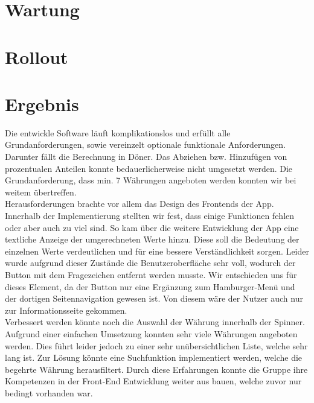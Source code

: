 \documentclass[conference]{IEEEtran}
\begin{document}
\section{Wartung}

\section{Rollout}

\section{Ergebnis}

Die entwickle Software läuft komplikationslos und erfüllt alle Grundanforderungen, sowie vereinzelt optionale funktionale Anforderungen. Darunter fällt die Berechnung in Döner.  Das Abziehen bzw. Hinzufügen von prozentualen Anteilen konnte bedauerlicherweise nicht umgesetzt werden. Die Grundanforderung, dass min. 7 Währungen angeboten werden konnten wir bei weitem übertreffen.\\
Herausforderungen brachte vor allem das Design des Frontends der App. Innerhalb der Implementierung stellten wir fest, dass einige Funktionen fehlen oder aber auch zu viel sind. So kam über die weitere Entwicklung der App eine textliche Anzeige der umgerechneten Werte hinzu. Diese soll die Bedeutung der einzelnen Werte verdeutlichen und für eine bessere Verständlichkeit sorgen. Leider wurde aufgrund dieser Zustände die Benutzeroberfläche sehr voll, wodurch der Button mit dem Fragezeichen entfernt werden musste. Wir entschieden uns für dieses Element, da der Button nur eine Ergänzung zum Hamburger-Menü und der dortigen Seitennavigation gewesen ist. Von diesem wäre der Nutzer auch nur zur Informationsseite gekommen. \\
Verbessert werden könnte noch die Auswahl der Währung innerhalb der Spinner. Aufgrund einer einfachen Umsetzung konnten sehr viele Währungen angeboten werden. Dies führt leider jedoch zu einer sehr unübersichtlichen Liste, welche sehr lang ist. Zur Lösung könnte eine Suchfunktion implementiert werden, welche die begehrte Währung herausfiltert. Durch diese Erfahrungen konnte die Gruppe ihre Kompetenzen in der Front-End Entwicklung weiter aus bauen, welche zuvor nur bedingt vorhanden war.
\end{document}
